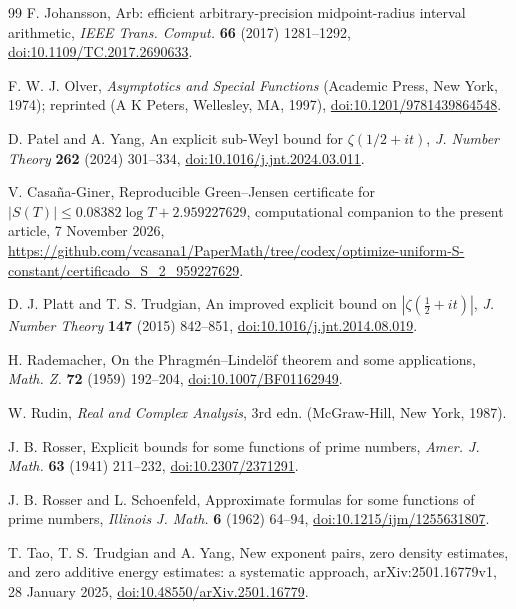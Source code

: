 \documentclass[11pt,reqno]{amsart}
\numberwithin{equation}{section}
\theoremstyle{definition}
\theoremstyle{remark}
\begin{document}
\begin{thebibliography}{99}
 F. Johansson, Arb: efficient arbitrary-precision midpoint-radius interval arithmetic, \textit{IEEE Trans. Comput.} \textbf{66} (2017) 1281--1292, \href{https://doi.org/10.1109/TC.2017.2690633}{doi:10.1109/TC.2017.2690633}.

 F. W. J. Olver, \textit{Asymptotics and Special Functions} (Academic Press, New York, 1974); reprinted (A K Peters, Wellesley, MA, 1997), \href{https://doi.org/10.1201/9781439864548}{doi:10.1201/9781439864548}.

 D. Patel and A. Yang, An explicit sub-Weyl bound for $\zeta(1/2+it)$, \textit{J. Number Theory} \textbf{262} (2024) 301--334, \href{https://doi.org/10.1016/j.jnt.2024.03.011}{doi:10.1016/j.jnt.2024.03.011}.

 V. Casa\~na-Giner, Reproducible Green--Jensen certificate for $|S(T)|\le0.08382\log T+2.959227629$, computational companion to the present article, 7 November 2026, \url{https://github.com/vcasana1/PaperMath/tree/codex/optimize-uniform-S-constant/certificado_S_2_959227629}.

 D. J. Platt and T. S. Trudgian, An improved explicit bound on $|\zeta(\frac12+it)|$, \textit{J. Number Theory} \textbf{147} (2015) 842--851, \href{https://doi.org/10.1016/j.jnt.2014.08.019}{doi:10.1016/j.jnt.2014.08.019}.

 H. Rademacher, On the Phragm\'en--Lindel\"of theorem and some applications, \textit{Math. Z.} \textbf{72} (1959) 192--204, \href{https://doi.org/10.1007/BF01162949}{doi:10.1007/BF01162949}.

 W. Rudin, \textit{Real and Complex Analysis}, 3rd edn. (McGraw-Hill, New York, 1987).

 J. B. Rosser, Explicit bounds for some functions of prime numbers, \textit{Amer. J. Math.} \textbf{63} (1941) 211--232, \href{https://doi.org/10.2307/2371291}{doi:10.2307/2371291}.

 J. B. Rosser and L. Schoenfeld, Approximate formulas for some functions of prime numbers, \textit{Illinois J. Math.} \textbf{6} (1962) 64--94, \href{https://doi.org/10.1215/ijm/1255631807}{doi:10.1215/ijm/1255631807}.

 T. Tao, T. S. Trudgian and A. Yang, New exponent pairs, zero density estimates, and zero additive energy estimates: a systematic approach, arXiv:2501.16779v1, 28 January 2025, \href{https://doi.org/10.48550/arXiv.2501.16779}{doi:10.48550/arXiv.2501.16779}.


\end{thebibliography}
\end{document}
